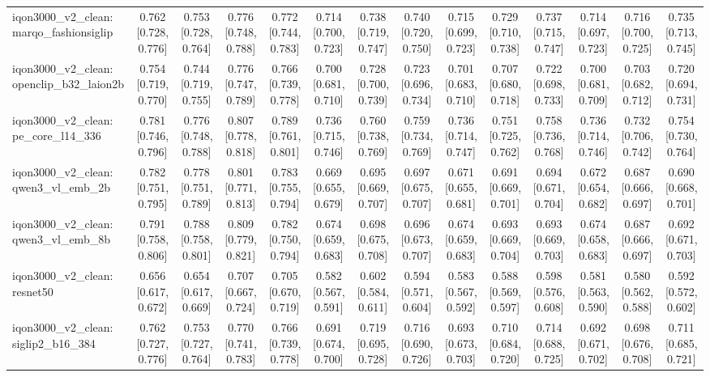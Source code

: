 \begin{table}[t]
\begin{tabular}{lccccccccccccc}
iqon3000\_v2\_clean: marqo\_fashionsiglip & 0.762 [0.728, 0.776] & 0.753 [0.728, 0.764] & 0.776 [0.748, 0.788] & 0.772 [0.744, 0.783] & 0.714 [0.700, 0.723] & 0.738 [0.719, 0.747] & 0.740 [0.720, 0.750] & 0.715 [0.699, 0.723] & 0.729 [0.710, 0.738] & 0.737 [0.715, 0.747] & 0.714 [0.697, 0.723] & 0.716 [0.700, 0.725] & 0.735 [0.713, 0.745] \\
iqon3000\_v2\_clean: openclip\_b32\_laion2b & 0.754 [0.719, 0.770] & 0.744 [0.719, 0.755] & 0.776 [0.747, 0.789] & 0.766 [0.739, 0.778] & 0.700 [0.681, 0.710] & 0.728 [0.700, 0.739] & 0.723 [0.696, 0.734] & 0.701 [0.683, 0.710] & 0.707 [0.680, 0.718] & 0.722 [0.698, 0.733] & 0.700 [0.681, 0.709] & 0.703 [0.682, 0.712] & 0.720 [0.694, 0.731] \\
iqon3000\_v2\_clean: pe\_core\_l14\_336 & 0.781 [0.746, 0.796] & 0.776 [0.748, 0.788] & 0.807 [0.778, 0.818] & 0.789 [0.761, 0.801] & 0.736 [0.715, 0.746] & 0.760 [0.738, 0.769] & 0.759 [0.734, 0.769] & 0.736 [0.714, 0.747] & 0.751 [0.725, 0.762] & 0.758 [0.736, 0.768] & 0.736 [0.714, 0.746] & 0.732 [0.706, 0.742] & 0.754 [0.730, 0.764] \\
iqon3000\_v2\_clean: qwen3\_vl\_emb\_2b & 0.782 [0.751, 0.795] & 0.778 [0.751, 0.789] & 0.801 [0.771, 0.813] & 0.783 [0.755, 0.794] & 0.669 [0.655, 0.679] & 0.695 [0.669, 0.707] & 0.697 [0.675, 0.707] & 0.671 [0.655, 0.681] & 0.691 [0.669, 0.701] & 0.694 [0.671, 0.704] & 0.672 [0.654, 0.682] & 0.687 [0.666, 0.697] & 0.690 [0.668, 0.701] \\
iqon3000\_v2\_clean: qwen3\_vl\_emb\_8b & 0.791 [0.758, 0.806] & 0.788 [0.758, 0.801] & 0.809 [0.779, 0.821] & 0.782 [0.750, 0.794] & 0.674 [0.659, 0.683] & 0.698 [0.675, 0.708] & 0.696 [0.673, 0.707] & 0.674 [0.659, 0.683] & 0.693 [0.669, 0.704] & 0.693 [0.669, 0.703] & 0.674 [0.658, 0.683] & 0.687 [0.666, 0.697] & 0.692 [0.671, 0.703] \\
iqon3000\_v2\_clean: resnet50 & 0.656 [0.617, 0.672] & 0.654 [0.617, 0.669] & 0.707 [0.667, 0.724] & 0.705 [0.670, 0.719] & 0.582 [0.567, 0.591] & 0.602 [0.584, 0.611] & 0.594 [0.571, 0.604] & 0.583 [0.567, 0.592] & 0.588 [0.569, 0.597] & 0.598 [0.576, 0.608] & 0.581 [0.563, 0.590] & 0.580 [0.562, 0.588] & 0.592 [0.572, 0.602] \\
iqon3000\_v2\_clean: siglip2\_b16\_384 & 0.762 [0.727, 0.776] & 0.753 [0.727, 0.764] & 0.770 [0.741, 0.783] & 0.766 [0.739, 0.778] & 0.691 [0.674, 0.700] & 0.719 [0.695, 0.728] & 0.716 [0.690, 0.726] & 0.693 [0.673, 0.703] & 0.710 [0.684, 0.720] & 0.714 [0.688, 0.725] & 0.692 [0.671, 0.702] & 0.698 [0.676, 0.708] & 0.711 [0.685, 0.721] \\

\end{tabular}
\end{table}
